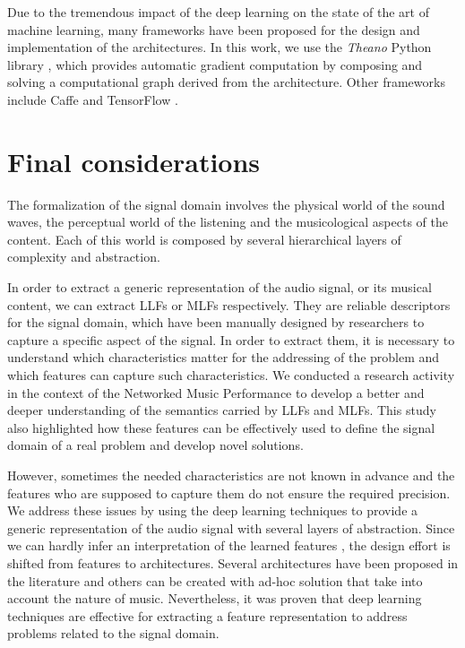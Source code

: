Due to the tremendous impact of the deep learning on the state of the art of machine learning, many frameworks have been proposed for the design and implementation of the architectures. In this work, we use the \textit{Theano} Python library \cite{Bergstra2010}, which provides automatic gradient computation by composing and solving a computational graph derived from the architecture. Other frameworks include Caffe \cite{jia2014caffe} and TensorFlow \cite{tensorflow}.

\section{Final considerations}
The formalization of the signal domain involves the physical world of the sound waves, the perceptual world of the listening and the musicological aspects of the content. Each of this world is composed by several hierarchical layers of complexity and abstraction.

In order to extract a generic representation of the audio signal, or its musical content, we can extract LLFs or MLFs respectively. They are reliable descriptors for the signal domain, which have been manually designed by researchers to capture a specific aspect of the signal. In order to extract them, it is necessary to understand which characteristics matter for the addressing of the problem and which features can capture such characteristics. We conducted a research activity in the context of the Networked Music Performance to develop a better and deeper understanding of the semantics carried by LLFs and MLFs. This study also highlighted how these features can be effectively used to define the signal domain of a real problem and develop novel solutions.

However, sometimes the needed characteristics are not known in advance and the features who are supposed to capture them do not ensure the required precision. We address these issues by using the deep learning techniques to provide a generic representation of the audio signal with several layers of abstraction. Since we can hardly infer an interpretation of the learned features \cite{choi2015auralisation}, the design effort is shifted from features to architectures. Several architectures have been proposed in the literature and others can be created with ad-hoc solution that take into account the nature of music. Nevertheless, it was proven that deep learning techniques are effective for extracting a feature representation to address problems related to the signal domain. 
